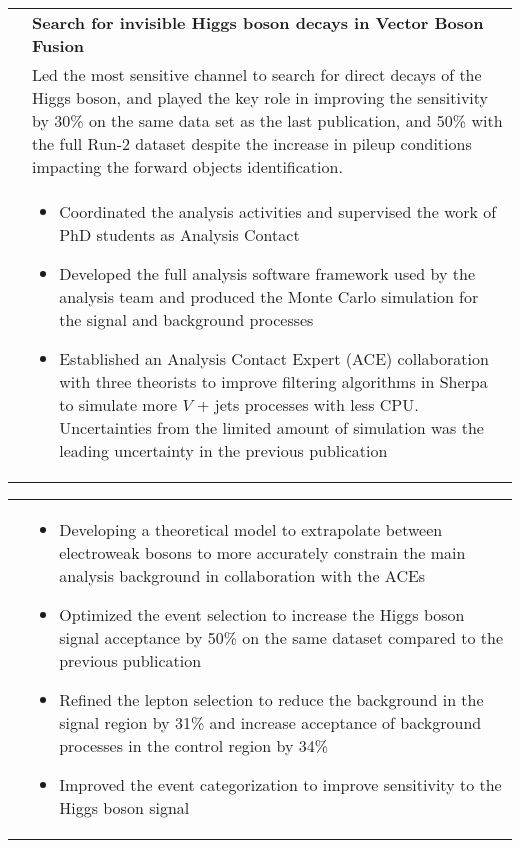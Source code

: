 \documentclass[a4paper,10pt]{article}
\begin{document}
\begin{tabularx}{\textwidth}{>{\centering\arraybackslash}X p{} }
{\bf Analysis} &  \textbf{Search for invisible Higgs boson decays in Vector Boson Fusion} \\
			   & Led the most sensitive channel to search for direct decays of the Higgs boson, and played the key role in improving the sensitivity
         by 30\% on the same data set as the last publication, and 50\% with the full Run-2 dataset despite the increase in pileup conditions impacting the forward objects identification. \\
			   & \begin{itemize}
         \item Coordinated the analysis activities and supervised the work of PhD students as Analysis Contact
			   \item Developed the full analysis software framework used by the analysis team and produced the Monte Carlo simulation for the signal and background processes
			   \item Established an Analysis Contact Expert (ACE) collaboration with three theorists to improve filtering algorithms in Sherpa to simulate more $V$ + jets processes with less CPU. Uncertainties from the limited amount of simulation was the leading uncertainty in the previous publication
			\end{itemize}
\end{tabularx}
\begin{tabularx}{\textwidth}{>{\centering\arraybackslash}X p{} }
			& \begin{itemize}
				\item Developing a theoretical model to extrapolate between electroweak bosons to more accurately constrain the main analysis background in collaboration with the ACEs
				\item Optimized the event selection to increase the Higgs boson signal acceptance by 50\% on the same dataset compared to the previous publication
				\item Refined the lepton selection to reduce the background in the signal region by 31\% and increase acceptance of background processes in the control region by 34\%
				\item Improved the event categorization to improve sensitivity to the Higgs boson signal
			  \end{itemize}\\[-1.5ex]
\end{tabularx}


\vspace{3mm}
\end{document}
